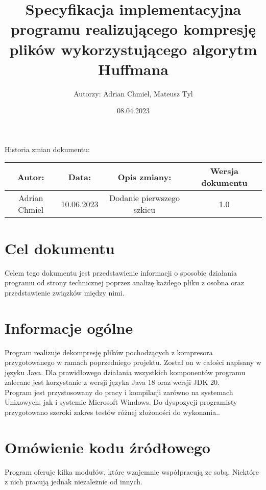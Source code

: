 \documentclass[]{article}
\title{Specyfikacja implementacyjna programu realizującego kompresję plików wykorzystującego algorytm Huffmana}
\author{Autorzy: Adrian Chmiel, Mateusz Tyl}
\date{08.04.2023}
\begin{document}
\maketitle
\begin{center}
Historia zmian dokumentu:\\
\end{center}

\begin{tabular}{|c|c|c|c|}
  \hline 
  Autor: & Data: & Opis zmiany:& Wersja dokumentu \\
  \hline
  Adrian Chmiel & 10.06.2023 & Dodanie pierwszego szkicu & 1.0 \\
\hline
\end{tabular} 
\section{Cel dokumentu}\label{header-n231}

Celem tego dokumentu jest przedstawienie informacji o sposobie działania programu od strony technicznej poprzez analizę każdego pliku z osobna oraz przedstawienie związków między nimi.
\section{Informacje ogólne}\label{header-n231}
Program realizuje dekompresję plików pochodzących z kompresora przygotowanego w ramach poprzedniego projektu. Został on w całości napisany w języku Java. Dla prawidłowego działania wszystkich komponentów programu zalecane jest korzystanie z wersji języka Java 18 oraz wersji JDK 20.\\
Program jest przystosowany do pracy i kompilacji zarówno na systemach Unixowych, jak i systemie Microsoft Windows. Do dyspozycji programisty przygotowano szeroki zakres testów różnej złożoności do wykonania..

\section{Omówienie kodu źródłowego}\label{header-n231}
Program oferuje kilka modułów, które wzajemnie współpracują ze sobą. Niektóre z nich pracują jednak niezależnie od innych.
\end{document}
